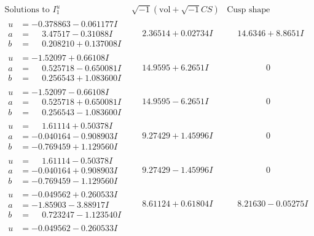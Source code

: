 \documentclass[1p]{elsarticle_modified}
\theoremstyle{definition}
\newcommand{\I}{\sqrt{-1}}
\begin{document}
$$\begin{array}{c|c|c}
\text{Solutions to }I^u_{1}& \I (\text{vol} + \sqrt{-1}CS) & \text{Cusp shape}\\
 \hline 
\begin{aligned}
u &= -0.378863 - 0.061177 I \\
a &= \phantom{-}3.47517 - 0.31088 I \\
b &= \phantom{-}0.208210 + 0.137008 I\end{aligned}
 & \phantom{-}2.36514 + 0.02734 I & \phantom{-}14.6346 + 8.8651 I \\ \hline\begin{aligned}
u &= -1.52097 + 0.66108 I \\
a &= \phantom{-}0.525718 - 0.650081 I \\
b &= \phantom{-}0.256543 + 1.083600 I\end{aligned}
 & \phantom{-}14.9595 + 6.2651 I & \phantom{-0.000000 } 0 \\ \hline\begin{aligned}
u &= -1.52097 - 0.66108 I \\
a &= \phantom{-}0.525718 + 0.650081 I \\
b &= \phantom{-}0.256543 - 1.083600 I\end{aligned}
 & \phantom{-}14.9595 - 6.2651 I & \phantom{-0.000000 } 0 \\ \hline\begin{aligned}
u &= \phantom{-}1.61114 + 0.50378 I \\
a &= -0.040164 - 0.908903 I \\
b &= -0.769459 + 1.129560 I\end{aligned}
 & \phantom{-}9.27429 + 1.45996 I & \phantom{-0.000000 } 0 \\ \hline\begin{aligned}
u &= \phantom{-}1.61114 - 0.50378 I \\
a &= -0.040164 + 0.908903 I \\
b &= -0.769459 - 1.129560 I\end{aligned}
 & \phantom{-}9.27429 - 1.45996 I & \phantom{-0.000000 } 0 \\ \hline\begin{aligned}
u &= -0.049562 + 0.260533 I \\
a &= -1.85903 - 3.88917 I \\
b &= \phantom{-}0.723247 - 1.123540 I\end{aligned}
 & \phantom{-}8.61124 + 0.61804 I & \phantom{-}8.21630 - 0.05275 I \\ \hline\begin{aligned}
u &= -0.049562 - 0.260533 I \\

\end{aligned}
\end{array}$$
\end{document}
